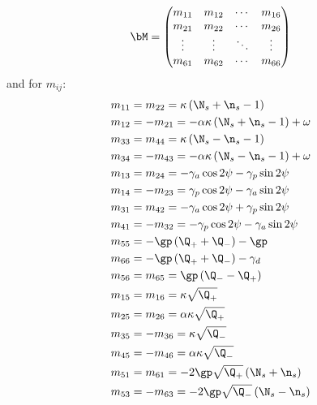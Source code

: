 \documentclass[12pt, notitlepage]{report}
\begin{document}
\begin{equation}
	\bM = \begin{pmatrix}
		m_{11} & m_{12} & \cdots & m_{16} \\
		m_{21} & m_{22} & \cdots &m_{26}\\
		\vdots & \vdots & \ddots & \vdots\\
		m_{61} & m_{62} & \cdots&  m_{66} 
	\end{pmatrix}
\end{equation}
and for $m_{ij}$:
\begin{align}
	m_{11} &= m_{22} = \kappa \left(\N_s + \n_s - 1\right)\\
	m_{12} &= -m_{21} = -\alpha\kappa\left(\N_s+\n_s-1\right) + \omega\\
	m_{33} &= m_{44} = \kappa \left(\N_s - \n_s - 1\right) \\
	m_{34} &= -m_{43} = - \alpha\kappa \left(\N_s - \n_s - 1\right) + \omega \\
	m_{13} &= m_{24} = -\gamma_a\cos2\psi - \gamma_p\sin2\psi \\
	m_{14} &= -m_{23} =  \gamma_p\cos2\psi - \gamma_a\sin2\psi \\
	m_{31} &= m_{42} =  -\gamma_a\cos2\psi + \gamma_p\sin2\psi \\
	m_{41} &= -m_{32} =  -\gamma_p\cos2\psi - \gamma_a\sin2\psi \\
	m_{55} &= -\gp\left(\Q_+ + \Q_- \right) - \gp\\
	m_{66} &= - \gp\left(\Q_+ + \Q_-\right) -\gamma_d \\
	m_{56} &= m_{65} = \gp\left(\Q_- - \Q_+\right)	\\
	m_{15} &= m_{16} = \kappa\sqrt{\Q_+}\\
	m_{25} &= m_{26} = \alpha\kappa\sqrt{\Q_+}\\
	m_{35} &= -m_{36} = \kappa\sqrt{\Q_-}\\
	m_{45} &= -m_{46} = \alpha\kappa\sqrt{\Q_-}\\
	m_{51} &= m_{61} = -2\gp\sqrt{\Q_+}\left(\N_s + \n_s\right) \\
	m_{53} &= -m_{63} = -2\gp\sqrt{\Q_-}\left(\N_s - \n_s\right) \\
\end{align}
\end{document}
